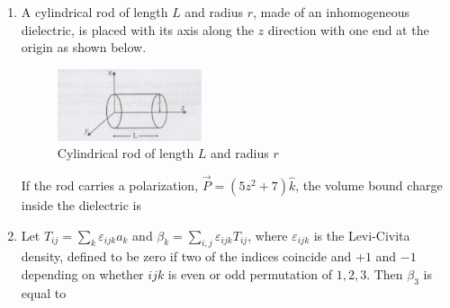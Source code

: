\documentclass[14pt, a4paper]{extarticle}
\begin{document}
\begin{enumerate}[label=\textbf{Q. \arabic*}, start=21]
\item A cylindrical rod of length $L$ and radius $r$, made of an inhomogeneous dielectric, is placed with its axis along the $z$ direction with one end at the origin as shown below.
\begin{figure}[H]
\centering
\includegraphics[width=0.4\textwidth]{figs/Q25fig.png}
\caption{Cylindrical rod of length $L$ and radius $r$ }
\label{fig:q25}
\end{figure}
If the rod carries a polarization, $\vec{P} = (5z^2 + 7)\hat{k}$, the volume bound charge inside the dielectric is
\begin{enumerate}
\end{enumerate}

\item Let $T_{ij} = \sum_k \varepsilon_{ijk} a_k$ and $\beta_k = \sum_{i,j} \varepsilon_{ijk} T_{ij}$, where $\varepsilon_{ijk}$ is the Levi-Civita density, defined to be zero if two of the indices coincide and $+1$ and $-1$ depending on whether $ijk$ is even or odd permutation of $1,2,3$. Then $\beta_3$ is equal to
\begin{enumerate}
\end{enumerate}


\end{enumerate}
\end{document}
